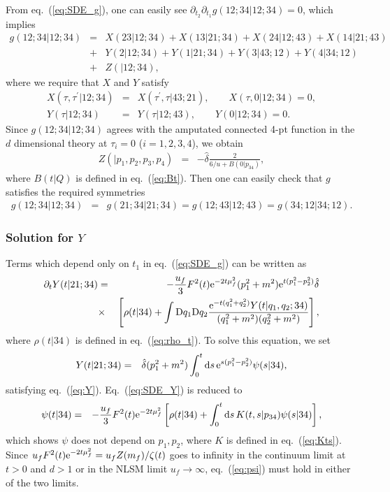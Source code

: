 \documentclass[preprint]{ptephy_v1}%
\newcommand{\rme}{{\rm e}}
\newcommand{\rmd}{{\rm d}}
\newcommand{\rmD}{{\rm D}}
\begin{document}
 From eq.~(\ref{eq:SDE_g}),
one can easily see $\partial_{t_2}\partial_{t_1}g(12;34\vert 12;34) =0$, which implies
\begin{eqnarray}
g(12;34\vert 12;34) &=&X(23\vert 12;34) + X(13\vert 21;34)+X(24\vert 12;43)+X(14\vert 21;43)\nonumber \\
&+& Y(2\vert 12;34)+ Y(1\vert 21;34)+ Y(3\vert 43;12)+ Y(4\vert 34;12) \nonumber \\
&+& Z(\vert 12;34),
\end{eqnarray}
where we  require that $X$ and $Y$ satisfy  
\begin{eqnarray}
X(\tau,\tau^\prime \vert 12;34) &=& X(\tau^\prime,\tau \vert 43;21), \qquad
X(\tau,0 \vert 12;34) =0, \\
Y(\tau\vert 12;34) &=& Y(\tau\vert 12;43), \qquad Y(0 \vert 12;34) = 0.
\label{eq:Y}
\end{eqnarray}
Since $g(12;34\vert 12;34)$ agrees with the amputated connected 4-pt function in the $d$  dimensional theory at $ \tau_i = 0$ ($i=1,2,3,4$), we obtain
\begin{eqnarray}
Z(\vert p_1,p_2,p_3,p_4) &=& -\hat\delta \frac{2}{6/u+ B(0 \vert p_{34})},
\end{eqnarray}
 where $B(t \vert Q)$ is defined in eq.~(\ref{eq:Bt}).
Then one can easily check that  $g$ satisfies the required symmetries
\begin{eqnarray}
g(12;34\vert 12;34) &=& g(21;34\vert 21;34) =g(12;43\vert 12;43)=g(34;12\vert 34;12) .
\end{eqnarray}

\subsubsection{Solution  for $Y$}
Terms which  depend only on $t_1$ in eq.~(\ref{eq:SDE_g}) can be written as
\begin{eqnarray}
\partial_t Y(t\vert 21;34) &=& -\frac{u_f}{3} F^2(t) \rme^{-2t\mu_f^2}(p_1^2+m^2) \rme^{t(p_1^2-p_2^2)}
\hat\delta \nonumber \\
&\times& \left[ \rho(t\vert 34) +\int \rmD q_1\rmD q_2 \frac{\rme^{-t(q_1^2+q_2^2)} Y(t\vert q_1,q_2;34)}{(q_1^2+m^2)(q_2^2+m^2)}\right],
\label{eq:SDE_Y}
\end{eqnarray}
 where $\rho(t\vert34)$ is defined in eq.~(\ref{eq:rho_t}).
To solve this equation, we set
\begin{eqnarray}
Y(t\vert 21;34) &=& \hat\delta (p_1^2+m^2)\int_0^t \rmd s\, \rme^{s(p_1^2-p_2^2)}\psi(s\vert 34),
\end{eqnarray}
 satisfying eq.~(\ref{eq:Y}).
Eq.~(\ref{eq:SDE_Y}) is reduced to
\begin{eqnarray}
\psi(t\vert 34) &=& -\frac{u_f}{3} F^2(t)\rme^{-2t \mu_f^2} \left[\rho(t\vert 34) +\int_0^t \rmd s\, K(t,s\vert  p_{34}) \psi(s\vert 34) \right] ,
\end{eqnarray}
which shows $\psi$ does not depend on $p_1,p_2$,  where $K$ is defined in eq.~(\ref{eq:Kts}).
Since $u_f F^2(t) \rme^{-2t\mu_f^2} = u_f Z(m_f)/\zeta(t)$  goes to infinity in the continuum limit at
$t>0$ and  $d>1$ or in the NLSM   limit $u_f\rightarrow\infty$,   eq.~(\ref{eq:psi})
must hold 
in either of  the two limits.
\end{document}
